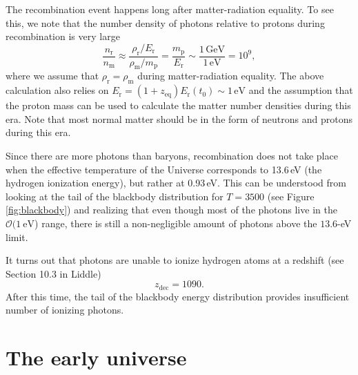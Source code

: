 \documentclass[a4paper,12pt]{article}
\theoremstyle{remark}
\newcommand{\mrm}[1]{\mathrm{#1}}
\renewcommand{\=}[1]{\stackrel{#1}{=}} %
\theoremstyle{plain}
\theoremstyle{definition}
\begin{document}
The recombination event happens long after matter-radiation equality. To see this, we note that the number density of photons relative to protons during recombination is very large
\begin{equation}
\frac{n_\mrm{r}}{n_\mrm{m}} \approx \frac{\rho _\mrm{r}/E_\mrm{r}}{\rho _\mrm{m} / m_\mrm{p}} = \frac{m_\mrm{p}}{E_\mrm{r}} \sim \frac{1\,\mrm{GeV}}{1\,\mrm{eV}} = 10^9,
\end{equation}
where we assume that $\rho _\mrm{r} = \rho _\mrm{m}$ during matter-radiation equality. The above calculation also relies on $E_\mrm{r} = (1+z_\mrm{eq})E_\mrm{r}(t_0) \sim 1\,\mrm{eV}$ and the assumption that the proton mass can be used to calculate the matter number densities during this era. Note that most normal matter should be in the form of neutrons and protons during this era.

Since there are more photons than baryons, recombination does not take place when the effective temperature of the Universe corresponds to 13.6\,eV (the hydrogen ionization energy), but rather at 0.93\,eV. This can be understood from looking at the tail of the blackbody distribution for $T=3500$ (see Figure \ref{fig:blackbody}) and realizing that even though most of the photons live in the $\mathcal{O}(1 \:\mrm{eV}$) range, there is still a non-negligible amount of photons above the $13.6$-eV limit.

It turns out that photons are unable to ionize hydrogen atoms at a redshift (see Section 10.3 in Liddle)
\begin{equation}
z_\mrm{dec} = 1090.
\end{equation}
After this time, the tail of the blackbody energy distribution provides insufficient number of ionizing photons. 

\section{The early universe}
\end{document}
